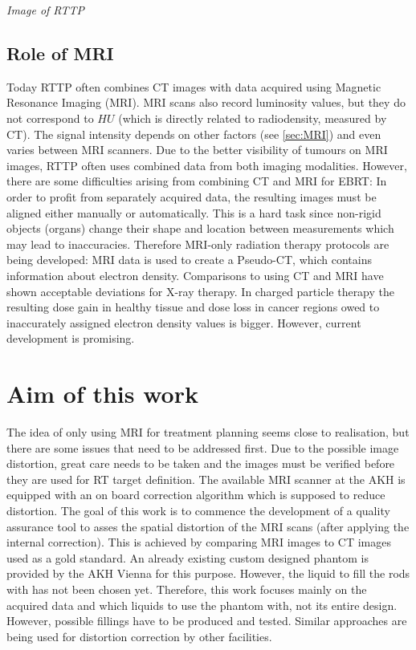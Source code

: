 \vspace{4cm}
\textit{Image of RTTP}
\vspace{2cm}

\subsection{Role of MRI}
Today RTTP often combines CT images with data acquired using Magnetic Resonance Imaging (MRI).
MRI scans also record luminosity values, but they do not correspond to $HU$ (which is directly related to radiodensity, measured by CT).
The signal intensity depends on other factors (see \ref{sec:MRI}) and even varies between MRI scanners.
Due to the better visibility of tumours on MRI images, RTTP often uses combined data from both imaging modalities.
However, there are some difficulties arising from combining CT and MRI for EBRT:
In order to profit from separately acquired data, the resulting images must be aligned either manually or automatically. This is a hard task since non-rigid objects (organs) change their shape and location between measurements which may lead to inaccuracies.
Therefore MRI-only radiation therapy protocols are being developed:
MRI data is used to create a Pseudo-CT, which contains information about electron density. Comparisons to using CT and MRI have shown acceptable deviations for X-ray therapy.
In charged particle therapy the resulting dose gain in healthy tissue and dose loss in cancer regions owed to inaccurately assigned electron density values is bigger.
However, current development is promising. \cite{Rank2013, Stanescu2006, Nyholm2015, Greer2015, Chen2004}



\section{Aim of this work}
The idea of only using MRI for treatment planning seems close to realisation, but there are some issues that need to be addressed first.
Due to the possible image distortion, great care needs to be taken and the images must be verified before they are used for RT target definition.
The available MRI scanner at the AKH is equipped with an on board correction algorithm which is supposed to reduce distortion.
The goal of this work is to commence the development of a quality assurance tool to asses the spatial distortion of the MRI scans (after applying the internal correction).
This is achieved by comparing MRI images to CT images used as a gold standard.
An already existing custom designed phantom is provided by the AKH Vienna for this purpose.
However, the liquid to fill the rods with has not been chosen yet.
Therefore, this work focuses mainly on the acquired data and which liquids to use the phantom with, not its entire design.
However, possible fillings have to be produced and tested.
Similar approaches are being used for distortion correction by other facilities. \cite{Price2015, Petersch2004, Torfeh2015, Wang2004, Wang2004b, Mizowaki2000}

